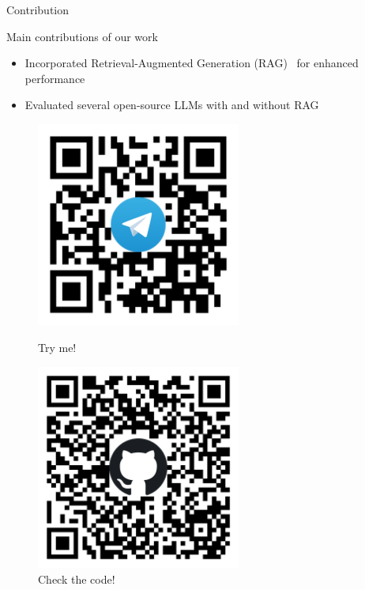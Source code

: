 \documentclass[handout]{beamer}\mode<handout>{\usetheme{AMSBolognaFC}}
\begin{document}
\begin{frame}{Contribution}
\begin{block}{Main contributions of our work}
\begin{itemize}
\begin{itemize}
	\end{itemize}
            \item Incorporated \alert{Retrieval-Augmented Generation (RAG)}~ for enhanced performance
            \item \alert{Evaluated} several open-source LLMs with and without RAG
        \end{itemize}
    \end{block}
    \vspace{-0.5em}
    \begin{figure}
        \begin{minipage}{0.3\textwidth}
            \centering
            \includegraphics[width=0.6\textwidth]{figures/telegram-bot}
            \caption{Try me!}
        \end{minipage}
        \hspace{2cm}
        \begin{minipage}{0.3\textwidth}
            \centering
            \includegraphics[width=0.6\textwidth]{figures/github-repo}
            \caption{Check the code!}
        \end{minipage}
        \hfill
        \label{fig:telegram-bot}
    \end{figure}


\end{frame}
\end{document}
